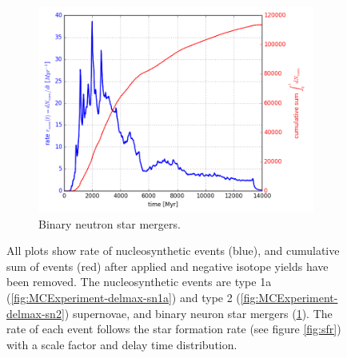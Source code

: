 \begin{figure}
\begin{subfigure}{\figwidth}
    \includegraphics[width=\linewidth]{results/MCExperiment_revised_2_delmax/nsm.png}
    \caption{ \label{fig:MCExperiment-delmax-nsm}
      Binary neutron star mergers.
    }
  \end{subfigure}
  \caption[\expone with \betadecay and removing negative isotope yields]{ \label{fig:MCExperiment-delmax-rate}
    All plots show rate of nucleosynthetic events (blue), and cumulative sum of events (red)
    after \betadecay applied and negative isotope yields have been removed.
    The nucleosynthetic events are type 1a (\ref{fig:MCExperiment-delmax-sn1a}) and type 2 (\ref{fig:MCExperiment-delmax-sn2})
    supernovae, and binary neuron star mergers (\ref{fig:MCExperiment-delmax-nsm}).
    The rate of each event follows the star formation rate (see figure \ref{fig:sfr}) with a scale factor and delay time distribution.
  } 
\end{figure}
\FloatBarrier %

